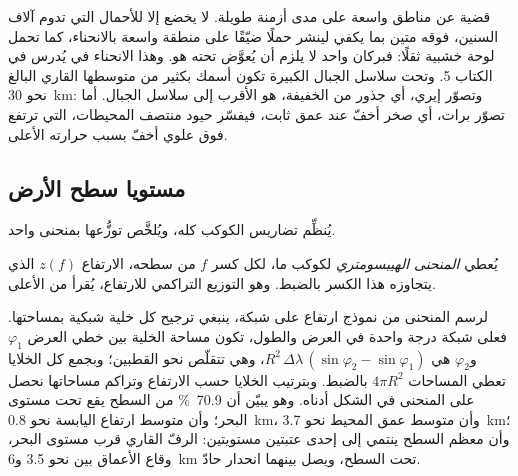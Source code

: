  قضية عن مناطق واسعة على مدى أزمنة طويلة.  لا يخضع إلا للأحمال التي تدوم آلاف السنين،  فوقه متين بما يكفي لينشر حملًا ضيّقًا على منطقة واسعة بالانحناء، كما تحمل لوحة خشبية ثقلًا: فبركان واحد لا يلزم أن يُعوَّض تحته هو. وهذا الانحناء في  يُدرس في الكتاب 5. وتحت سلاسل الجبال الكبيرة تكون  أسمك بكثير من متوسطها القاري البالغ نحو \qty{30}{km}: وتصوّر إيري، أي جذور من  الخفيفة، هو الأقرب إلى سلاسل الجبال. أما تصوّر برات، أي صخر أخفّ عند عمق ثابت، فيفسّر حيود منتصف المحيطات، التي ترتفع فوق  علوي أخفّ بسبب حرارته الأعلى.

\subsection*{مستويا سطح الأرض}

يُنظِّم  تضاريس الكوكب كله، ويُلخَّص توزُّعها بمنحنى واحد.

\begin{definition}\label{def:b1:isostasy-gravity:hypsometry}
يُعطي \emph{المنحنى الهيبسومتري} لكوكب ما، لكل كسر $f$ من سطحه، الارتفاع $z(f)$ الذي يتجاوزه هذا الكسر بالضبط. وهو التوزيع التراكمي للارتفاع، يُقرأ من الأعلى.
\end{definition}

لرسم المنحنى من نموذج ارتفاع على شبكة، ينبغي ترجيح كل خلية شبكية بمساحتها. فعلى شبكة درجة واحدة في العرض والطول، تكون مساحة الخلية بين خطي العرض $\varphi_1$ و$\varphi_2$ هي $R^2\,\Delta\lambda\,(\sin\varphi_2 - \sin\varphi_1)$، وهي تتقلّص نحو القطبين؛ وبجمع كل الخلايا تعطي المساحات $4\pi R^2$ بالضبط. وبترتيب الخلايا حسب الارتفاع وتراكم مساحاتها نحصل على المنحنى في الشكل أدناه. وهو يبيّن أن \qty{70.9}{\percent} من السطح يقع تحت مستوى البحر؛ وأن متوسط ارتفاع اليابسة نحو \qty{0.8}{km}، وأن متوسط عمق المحيط نحو \qty{3.7}{km}؛ وأن معظم السطح ينتمي إلى إحدى عتبتين مستويتين: الرفّ القاري قرب مستوى البحر، وقاع الأعماق بين نحو \num{3.5} و\qty{6}{km} تحت السطح، ويصل بينهما انحدار حادّ.

